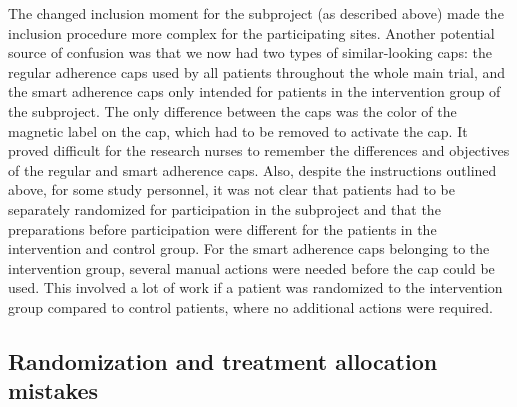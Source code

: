 \documentclass[twocolumn, issue, empirical, authordate]{jote-new-article}
\begin{document}
 The changed inclusion moment for the subproject (as described above)
made the inclusion procedure more complex for the participating sites.
 Another potential source of confusion was that we now had two types of similar-looking caps: the regular adherence caps used by all patients throughout the whole main trial, and the smart adherence caps only intended for patients in the intervention group of the subproject. The only difference between the caps was the color of the magnetic label on the cap, which had to be removed to activate the cap. It proved difficult for the research nurses to remember the differences and objectives of the regular and smart adherence caps.
 Also, despite the instructions outlined above, for some study personnel, it was not clear that patients had to be separately randomized for participation in the subproject and that the preparations before participation were different for the patients in the intervention and control group. For the smart adherence caps belonging to the intervention group, several manual actions were needed before the cap could be used. This involved a lot of work if a patient was randomized to the intervention group compared to control patients, where no additional actions were required.


\subsection{Randomization and treatment allocation mistakes}
\end{document}
